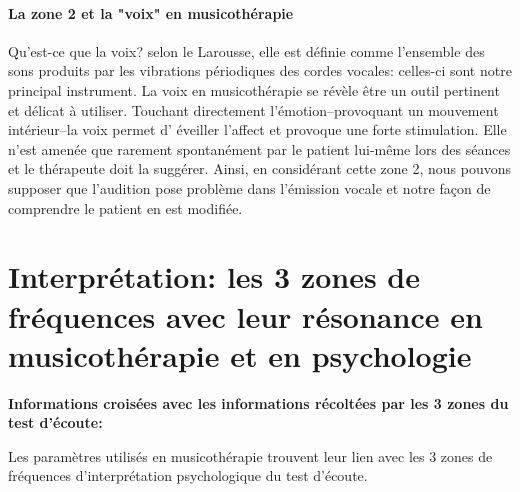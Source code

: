  \paragraph{La zone 2 et la "voix" en musicothérapie}
Qu'est-ce que la voix? selon le Larousse, elle est définie comme
l'ensemble des sons produits par les vibrations périodiques des
cordes vocales: celles-ci sont notre principal instrument.
La voix en musicothérapie se révèle être un outil pertinent et délicat
à utiliser. Touchant 
directement 
l'émotion--provoquant un mouvement intérieur--la voix permet d'
éveiller l'affect
et provoque une forte stimulation. Elle n'est amenée que rarement
spontanément par le patient lui-même lors des séances et le thérapeute doit la suggérer.
Ainsi, en considérant cette zone 2, nous pouvons supposer que l'audition pose problème dans l'émission
vocale et notre façon de comprendre le patient en est modifiée. 
       


\section{Interprétation: les 3 zones de fréquences avec leur résonance en musicothérapie et en
  psychologie}


	\textbf{Informations croisées avec les informations récoltées par les 3 
          zones du test d'écoute:}
          
Les paramètres utilisés en musicothérapie trouvent leur lien avec les
3 zones de fréquences d'interprétation psychologique du test d'écoute.

